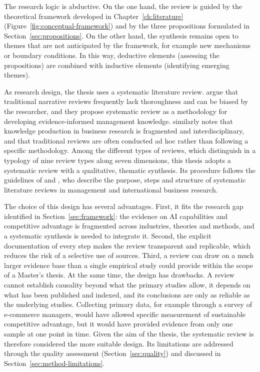 The research logic is abductive. On the one hand, the review is guided by the theoretical framework developed in Chapter~\ref{ch:literature} (Figure~\ref{fig:conceptual-framework}) and by the three propositions formulated in Section~\ref{sec:propositions}. On the other hand, the synthesis remains open to themes that are not anticipated by the framework, for example new mechanisms or boundary conditions. In this way, deductive elements (assessing the propositions) are combined with inductive elements (identifying emerging themes).

As research design, the thesis uses a systematic literature review. \textcite[207]{tranfield2003} argue that traditional narrative reviews frequently lack thoroughness and can be biased by the researcher, and they propose systematic review as a methodology for developing evidence-informed management knowledge. \textcite[333]{snyder2019} similarly notes that knowledge production in business research is fragmented and interdisciplinary, and that traditional reviews are often conducted ad hoc rather than following a specific methodology. Among the different types of reviews, which \textcite[183]{pare2015} distinguish in a typology of nine review types along seven dimensions, this thesis adopts a systematic review with a qualitative, thematic synthesis. Its procedure follows the guidelines of \textcite[2577]{kraus2022} and \textcite[1]{paul2020}, who describe the purpose, steps and structure of systematic literature reviews in management and international business research.

The choice of this design has several advantages. First, it fits the research gap identified in Section~\ref{sec:framework}: the evidence on AI capabilities and competitive advantage is fragmented across industries, theories and methods, and a systematic synthesis is needed to integrate it. Second, the explicit documentation of every step makes the review transparent and replicable, which reduces the risk of a selective use of sources. Third, a review can draw on a much larger evidence base than a single empirical study could provide within the scope of a Master's thesis. At the same time, the design has drawbacks. A review cannot establish causality beyond what the primary studies allow, it depends on what has been published and indexed, and its conclusions are only as reliable as the underlying studies. Collecting primary data, for example through a survey of e-commerce managers, would have allowed specific measurement of sustainable competitive advantage, but it would have provided evidence from only one sample at one point in time. Given the aim of the thesis, the systematic review is therefore considered the more suitable design. Its limitations are addressed through the quality assessment (Section~\ref{sec:quality}) and discussed in Section~\ref{sec:method-limitations}.

